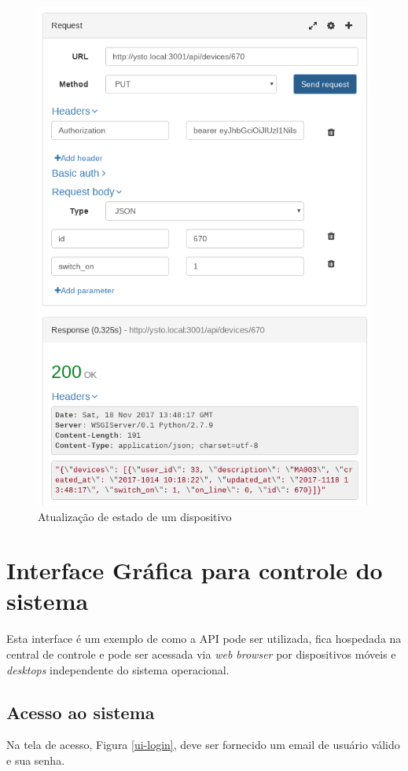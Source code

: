 \begin{figure}[H]
\caption{\label{api-update-device} Atualização de estado de um dispositivo}
\includegraphics[scale=0.35]{img/09-update-device.png}
\end{figure}


\section{Interface Gráfica para controle do sistema}
Esta interface é um exemplo de como a API pode ser utilizada, fica hospedada na central de controle e pode ser acessada via \textit{web browser} por dispositivos móveis e \textit{desktops} independente do sistema operacional.

\subsection{Acesso ao sistema}
Na tela de acesso, Figura \ref{ui-login}, deve ser fornecido um email de usuário válido e sua senha.

